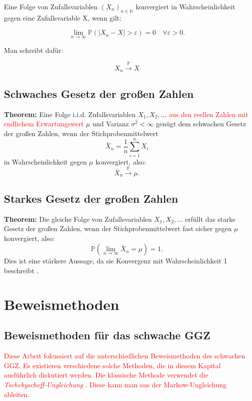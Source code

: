 \documentclass[aodsor,preprint]{imsart}
\numberwithin{equation}{section}
\theoremstyle{plain}
\begin{document}
Eine Folge von Zufallsvariablen $(X_{n})_{n\in \mathbb{N}}$ konvergiert in Wahrscheinlichkeit gegen eine Zufallsvariable X, wenn gilt:

$$ \lim_{n \to \infty} \mathbb{P}(|X_n - X| > \varepsilon) = 0 \quad \forall \varepsilon > 0. $$

Man schreibt dafür:

$$ X_{n} \xrightarrow{\mathbb{P}} X $$

\subsection{Schwaches Gesetz der großen Zahlen}
\textbf{Theorem:}  
Eine Folge i.i.d. Zufallsvariablen \( X_1, X_2, \dots \) \textcolor{red}{aus den reellen Zahlen mit endlichem Erwartungswert} \( \mu \) und Varianz \( \sigma^2 < \infty \) genügt dem schwachen Gesetz der großen Zahlen, wenn der Stichprobenmittelwert
\[
\bar{X}_n = \frac{1}{n} \sum_{i=1}^n X_i
\]
in Wahrscheinlichkeit gegen \( \mu \) konvergiert, also:
\[
\bar{X}_n \xrightarrow{\mathbb{P}} \mu.
\]

\subsection{Starkes Gesetz der großen Zahlen}

\textbf{Theorem:}  
Die gleiche Folge von Zufallsvariablen \( X_1, X_2, \dots \) erfüllt das starke Gesetz der großen Zahlen, wenn der Stichprobenmittelwert fast sicher gegen \( \mu \) konvergiert, also:
\[
\mathbb{P} \left( \lim_{n \to \infty} \bar{X}_n = \mu \right) = 1.
\]
Dies ist eine stärkere Aussage, da sie Konvergenz mit Wahrscheinlichkeit 1 beschreibt \citep{degroot2021}.


\section{Beweismethoden}
\label{sec:beweismethoden}


\subsection{Beweismethoden für das schwache GGZ}
\label{sec:beweisschwach}
\textcolor{red}{
Diese Arbeit fokussiert auf die unterschiedlichen Beweismethoden des schwachen GGZ.
Es existieren verschiedene solche Methoden, die in diesem Kapital ausführlich diskutiert werden.
Die klassische Methode verwendet die \textit{Tschebyscheff-Ungleichung} \citep{chebyshev1867}. Diese kann man aus der Markow-Ungleichung ableiten.}
\end{document}
